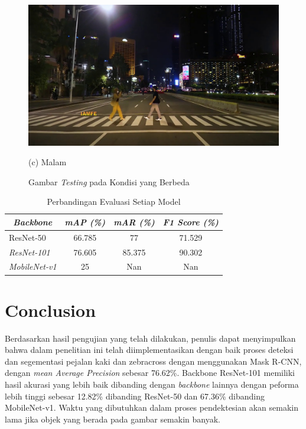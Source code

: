 \documentclass[conference]{IEEEtran}
\begin{document}
\begin{figure}[h]
\begin{minipage}[b]{0.2\textwidth}
			\includegraphics[width=\textwidth]{img/frame180.jpg}
			\caption*{(c) Malam}
		\end{minipage}
		\caption{{Gambar \textit{Testing} pada Kondisi yang Berbeda}}
		\label{fig:compare}
	\end{figure}

	\vspace{1ex}
	\begin{table}[h]
		\centering
		\begin{tabular}{|l|c|c|c|}
			\hline
			\multicolumn{1}{|c|}{\textit{\textbf{Backbone}}} & \textit{\textbf{mAP (\%)}} & \textit{\textbf{mAR (\%)}} & \textit{\textbf{F1 Score (\%)}} \\ \hline
			ResNet-50                                        & 66.785                     & 77                         & 71.529                          \\ \hline
			\textit{ResNet-101}                              & 76.605                     & 85.375                     & 90.302                          \\ \hline
			\textit{MobileNet-v1}                            & 25                         & Nan                        & Nan                             \\ \hline
		\end{tabular}
		\caption{Perbandingan Evaluasi Setiap Model}
		\label{tab:result}
	\end{table}
	
	\section{Conclusion}
	\vspace{1ex}
	Berdasarkan hasil pengujian yang telah dilakukan, penulis dapat menyimpulkan bahwa dalam penelitian ini telah diimplementasikan dengan baik proses deteksi dan segementasi pejalan kaki dan zebracross dengan menggunakan Mask R-CNN, dengan \textit{mean Average Precision} sebesar 76.62\%. {Backbone} ResNet-101 memiliki hasil akurasi yang lebih baik dibanding dengan \textit{backbone} lainnya dengan peforma lebih tinggi sebesar 12.82\% dibanding ResNet-50 dan 67.36\% dibanding MobileNet-v1. Waktu yang dibutuhkan dalam proses pendektesian akan semakin lama jika objek yang berada pada gambar semakin banyak. 
	
	
	
\end{document}
